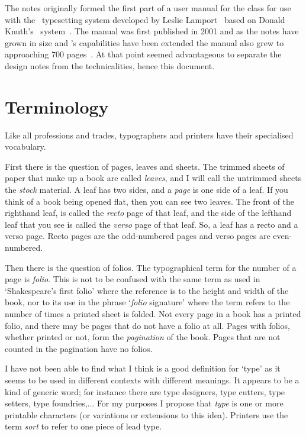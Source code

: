 \documentclass[10pt,letterpaper,extrafontsizes]{memoir}
\begin{document}
    The notes originally formed the first part of a user manual for
the  class for 
use with the \ltx\ typesetting system developed by Leslie 
Lamport~\autocite{LAMPORT94} based 
on Donald Knuth's \tx\ system~\autocite{TEXBOOK}. 
The manual was first published in 2001
and as the notes have grown in size and 's capabilities 
have been extended the manual also grew to approaching 700 pages~\autocite{MEMMAN}. 
At that point seemed advantageous to separate the design notes from the 
technicalities, hence this document.




\chapter{Terminology}

    Like all professions and trades, typographers and printers have their
specialised vocabulary.

First there is the question of pages, leaves and sheets.  The trimmed
sheets of paper that make up a book are called
\emph{leaves}, and I will call the untrimmed sheets the
\emph{stock} material.  A leaf has two sides, and a
\emph{page} is one side of a leaf.  If you think of a book
being opened flat, then you can see two leaves. The front of the
righthand leaf, is called the \emph{recto} page of that
leaf, and the side of the lefthand leaf that you see is called the
\emph{verso} page of that leaf.  So, a leaf has a recto
and a verso page. Recto pages are the odd-numbered pages and verso
pages are even-numbered.

   Then there is the question of folios. The typographical term for
the number of a page is \emph{folio}.
This is not to be confused with
the same term as used in `Shakespeare's first folio' where the reference is
to the height and width of the book, nor to its use in the phrase
`\emph{folio} signature' where the term refers to the 
number of times a printed sheet is folded. 
Not every page in a book has a printed
folio, and there may be pages that do not have a folio at all. Pages with
folios, whether printed or not, form the \emph{pagination} 
of the book. Pages
that are not counted in the pagination have no folios.

 I have not been able to find what I think is a good
definition for `type' as it seems to be used in different contexts with
different meanings. It appears to be a kind of generic word; for instance
there are type designers, type cutters, type setters, type foundries,...
For my purposes I propose that \emph{type} is 
one or more printable characters (or variations or extensions to this idea).  
Printers use the term \emph{sort} to refer to one piece of lead
type.
\end{document}
